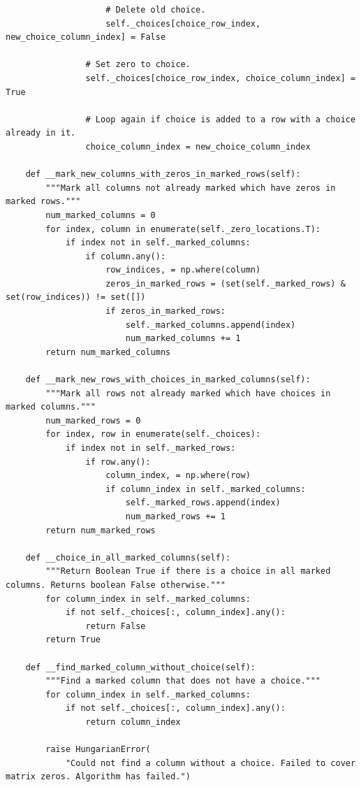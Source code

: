 \documentclass[12pt, letterpaper, twoside]{book}
\begin{document}
\begin{lstlisting}
                    # Delete old choice.
                    self._choices[choice_row_index, new_choice_column_index] = False

                # Set zero to choice.
                self._choices[choice_row_index, choice_column_index] = True

                # Loop again if choice is added to a row with a choice already in it.
                choice_column_index = new_choice_column_index

    def __mark_new_columns_with_zeros_in_marked_rows(self):
        """Mark all columns not already marked which have zeros in marked rows."""
        num_marked_columns = 0
        for index, column in enumerate(self._zero_locations.T):
            if index not in self._marked_columns:
                if column.any():
                    row_indices, = np.where(column)
                    zeros_in_marked_rows = (set(self._marked_rows) & set(row_indices)) != set([])
                    if zeros_in_marked_rows:
                        self._marked_columns.append(index)
                        num_marked_columns += 1
        return num_marked_columns

    def __mark_new_rows_with_choices_in_marked_columns(self):
        """Mark all rows not already marked which have choices in marked columns."""
        num_marked_rows = 0
        for index, row in enumerate(self._choices):
            if index not in self._marked_rows:
                if row.any():
                    column_index, = np.where(row)
                    if column_index in self._marked_columns:
                        self._marked_rows.append(index)
                        num_marked_rows += 1
        return num_marked_rows

    def __choice_in_all_marked_columns(self):
        """Return Boolean True if there is a choice in all marked columns. Returns boolean False otherwise."""
        for column_index in self._marked_columns:
            if not self._choices[:, column_index].any():
                return False
        return True

    def __find_marked_column_without_choice(self):
        """Find a marked column that does not have a choice."""
        for column_index in self._marked_columns:
            if not self._choices[:, column_index].any():
                return column_index

        raise HungarianError(
            "Could not find a column without a choice. Failed to cover matrix zeros. Algorithm has failed.")


\end{lstlisting}
\end{document}
